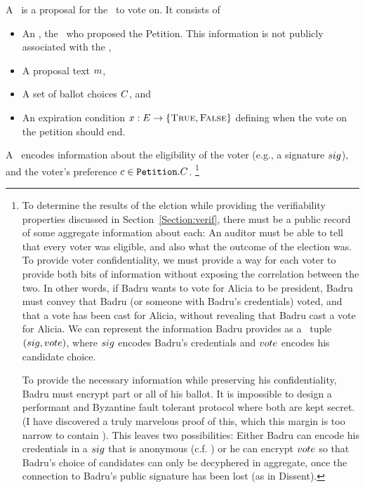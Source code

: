   A \StructPetition~is a proposal for the \KwCluster~to vote on. It consists of
    \begin{itemize}
      \item An \StructInstigator, the \KwPeer~who proposed the
        Petition. This information is not publicly associated with
        the \KwPetition,
      \item A proposal text $m$,
      \item A set of ballot choices $C$, and
      \item An expiration condition $x : E \to
        \{\textsc{True}, \textsc{False}\}$ defining when the vote on the petition should
        end.
   \end{itemize}

  A \StructBallot~encodes information about the eligibility of the voter (e.g.,
  a signature $sig$), and the voter's preference $c \in
  \texttt{Petition}.C$.
    \footnote{To determine the results of
    the elction while providing the verifiability properties discussed in
    Section~\ref{Section:verif}, there must be a public record of some
    aggregate information about each: An auditor must be able to tell that every
    voter was eligible, and also what the outcome of the election was. To
    provide voter confidentiality, we must provide a way for each voter to
    provide both bits of information without exposing the correlation between
    the two. In other words, if Badru wants to vote for Alicia to be president,
    Badru must convey that Badru (or someone with Badru's credentials) voted,
    and that a vote has been cast for Alicia, without revealing that Badru cast
    a vote for Alicia. We can represent the information Badru provides as a
    \StructBallot~tuple $(sig, vote)$, where $sig$ encodes Badru's
    credentials and $vote$ encodes his candidate choice.

    To provide the necessary information while preserving his
    confidentiality, Badru must encrypt part or all of his ballot. It is
    impossible to design a performant and Byzantine fault tolerant protocol
    where both are kept secret. (I have discovered a truly marvelous proof of
    this, which this margin is too narrow to contain \tocite). This leaves two
    possibilities: Either Badru can encode his credentials in a $sig$ that is
    anonymous (c.f. \cite{lrs}) or he can encrypt $vote$ so that Badru's choice
    of candidates can only be decyphered in aggregate, once the connection to
    Badru's public signature has been lost (as in Dissent).
  }


